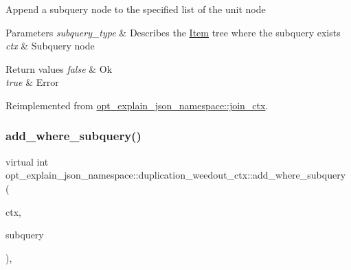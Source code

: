 Append a subquery node to the specified list of the unit node


\begin{DoxyParams}{Parameters}
{\em subquery\+\_\+type} & Describes the \mbox{\hyperlink{classItem}{Item}} tree where the subquery exists \\
\hline
{\em ctx} & Subquery node\\
\hline
\end{DoxyParams}

\begin{DoxyRetVals}{Return values}
{\em false} & Ok \\
\hline
{\em true} & Error \\
\hline
\end{DoxyRetVals}


Reimplemented from \mbox{\hyperlink{classopt__explain__json__namespace_1_1join__ctx_a5005892466618a6abcc3a5971c1d7433}{opt\+\_\+explain\+\_\+json\+\_\+namespace\+::join\+\_\+ctx}}.

\mbox{\label{classopt__explain__json__namespace_1_1duplication__weedout__ctx_ab9ed2cd6372ca07ead08bbe7ad56db22}} 
\subsubsection{\texorpdfstring{add\+\_\+where\+\_\+subquery()}{add\_where\_subquery()}}
{\footnotesize\ttfamily virtual int opt\+\_\+explain\+\_\+json\+\_\+namespace\+::duplication\+\_\+weedout\+\_\+ctx\+::add\+\_\+where\+\_\+subquery (\begin{DoxyParamCaption}\item[{\mbox{\hyperlink{classopt__explain__json__namespace_1_1subquery__ctx}{subquery\+\_\+ctx}} $\ast$}]{ctx,  }\item[{S\+E\+L\+E\+C\+T\+\_\+\+L\+E\+X\+\_\+\+U\+N\+IT $\ast$}]{subquery }\end{DoxyParamCaption})\hspace{0.3cm}{\ttfamily [inline]}, {\ttfamily [virtual]}}

